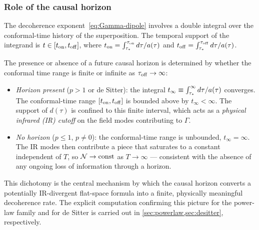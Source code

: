 \subsubsection*{Role of the causal horizon}

The decoherence exponent~\eqref{eq:Gamma-dipole} involves a double integral over
the conformal-time history of the superposition.  The temporal support of the
integrand is $t \in [t_{\rm on}, t_{\rm off}]$, where
$t_{\rm on} = \int_{\tau_*}^{\tau_{\rm on}} d\tau/a(\tau)$ and
$t_{\rm off} = \int_{\tau_*}^{\tau_{\rm off}} d\tau/a(\tau)$.

The presence or absence of a future causal horizon is determined by whether the
conformal time range is finite or infinite as $\tau_{\rm off} \to \infty$:
\begin{itemize}[leftmargin=2em]
  \item \emph{Horizon present} ($p > 1$ or de Sitter): the integral
    $t_{\infty} \equiv \int_{\tau_*}^{\infty} d\tau/a(\tau)$ converges.
    The conformal-time range $[t_{\rm on}, t_{\rm off}]$ is bounded above by
    $t_\infty < \infty$.  The support of $d(\tau)$ is confined to this finite
    interval, which acts as a \emph{physical infrared (IR) cutoff} on the
    field modes contributing to $\Gamma$.

  \item \emph{No horizon} ($p \leq 1$, $p \neq 0$): the conformal-time range is
    unbounded, $t_\infty = \infty$.  The IR modes then contribute a piece that
    saturates to a constant independent of $T$, so $\mathcal{N} \to \mathrm{const}$
    as $T \to \infty$ — consistent with the absence of any ongoing loss of
    information through a horizon.
\end{itemize}
This dichotomy is the central mechanism by which the causal horizon converts a
potentially IR-divergent flat-space formula into a finite, physically meaningful
decoherence rate.  The explicit computation confirming this picture for the
power-law family and for de Sitter is carried out in
\cref{sec:powerlaw,sec:desitter}, respectively.

